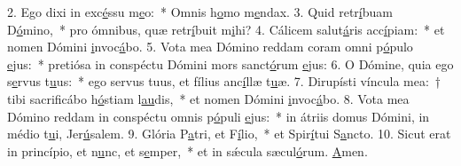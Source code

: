 2. Ego dixi in exc\uline{é}ssu m\uline{e}o:~* Omnis h\uline{o}mo m\uline{e}ndax.
3. Quid retr\uline{í}buam D\uline{ó}mino,~* pro ómnibus, quæ retr\uline{í}buit m\uline{i}hi?
4. Cálicem salut\uline{á}ris acc\uline{í}piam:~* et nomen Dómini \uline{i}nvoc\uline{á}bo.
5. Vota mea Dómino reddam coram omni p\uline{ó}pulo \uline{e}jus:~* pretiósa in conspéctu Dómini mors sanct\uline{ó}rum \uline{e}jus:
6. O Dómine, quia ego s\uline{e}rvus t\uline{u}us:~* ego servus tuus, et fílius anc\uline{í}llæ t\uline{u}æ.
7. Dirupísti víncula mea:~† tibi sacrificábo h\uline{ó}stiam l\uline{au}dis,~* et nomen Dómini \uline{i}nvoc\uline{á}bo.
8. Vota mea Dómino reddam in conspéctu omnis p\uline{ó}puli \uline{e}jus:~* in átriis domus Dómini, in médio t\uline{u}i, Jer\uline{ú}salem.
9. Glória P\uline{a}tri, et F\uline{í}lio,~* et Spir\uline{í}tui S\uline{a}ncto.
10. Sicut erat in princípio, et n\uline{u}nc, et s\uline{e}mper,~* et in sǽcula sæcul\uline{ó}rum. \uline{A}men.
